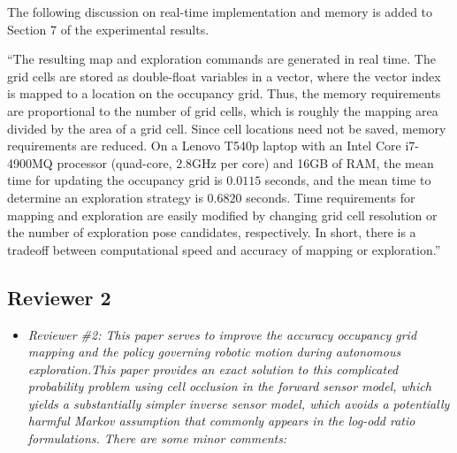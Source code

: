 \documentclass[11pt]{article}
\newenvironment{correction}{\begin{list}{}{\setlength{\leftmargin}{1cm}\setlength{\rightmargin}{1cm}}\vspace{\parsep}\item[]``}{''\end{list}}
\newcommand{\EditTL}[1]{{\color{red}\protect #1}}
\begin{document}
\begin{enumerate}
The following discussion on real-time implementation and memory is added to Section 7 of the experimental results.



\begin{correction}The resulting map and exploration commands are generated in real time. The grid cells are stored as double-float variables in a vector, where the vector index is mapped to a location on the occupancy grid. Thus, the memory requirements are proportional to the number of grid cells, which is roughly the mapping area divided by the area of a grid cell. Since cell locations need not be saved, memory requirements are reduced. On a Lenovo T540p laptop with an Intel Core i7-4900MQ processor (quad-core, 2.8GHz per core) and 16GB of RAM, the mean time for updating the occupancy grid is $0.0115$ seconds, and the mean time to determine an exploration strategy is $0.6820$ seconds. Time requirements for mapping and exploration are easily modified by changing grid cell resolution or the number of exploration pose candidates, respectively. In short, there is a tradeoff between computational speed and accuracy of mapping or exploration.\end{correction}

\end{enumerate}





\clearpage\newpage


\subsection*{Reviewer 2}

\setlength{\leftmargini}{0pt}
\begin{itemize}\setlength{\itemsep}{2\parsep}

\item {\itshape Reviewer \#2: This paper serves to improve the accuracy occupancy grid mapping and the policy governing robotic motion during autonomous exploration.This paper provides an exact solution to this complicated probability problem using cell occlusion in the forward sensor model, which yields a substantially simpler inverse sensor model, which avoids a potentially harmful Markov assumption that commonly appears in the log-odd ratio formulations. There are some minor comments:}
\end{itemize}
\end{document}
